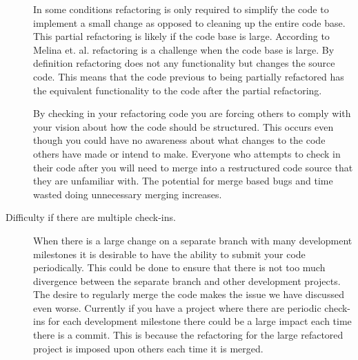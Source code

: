 \begin{description}
In some conditions refactoring is only required to simplify the code to implement a small change as opposed to cleaning up the entire code base.  This partial refactoring is likely if the code base is large. According to Melina et. al. \cite{Milea2014} refactoring is a challenge when the code base is large. By definition refactoring does not any functionality but changes the source code. This means that the code previous to being partially refactored has the equivalent functionality to the code after the partial refactoring.

By checking in your refactoring code you are forcing others to comply with your vision about how the code should be structured.  This occurs even though you could have no awareness about what changes to the code others have made or intend to make.  Everyone who attempts to check in their code after you will need to merge into a restructured code source that they are unfamiliar with.  The potential for merge based bugs and time wasted doing unnecessary merging increases.

% 
% 
\item [Difficulty if there are multiple check-ins.] 
When there is a large change on a separate branch with many development milestones it is desirable to have the ability to submit your code periodically.  This could be done to ensure that there is not too much divergence between the separate branch and other development projects. The desire to regularly merge the code makes the issue we have discussed even worse. Currently if you have a project where there are periodic check-ins for each development milestone there could be a large impact each time there is a commit. This is because the refactoring for the large refactored project is imposed upon others each time it is merged.


\end{description}
